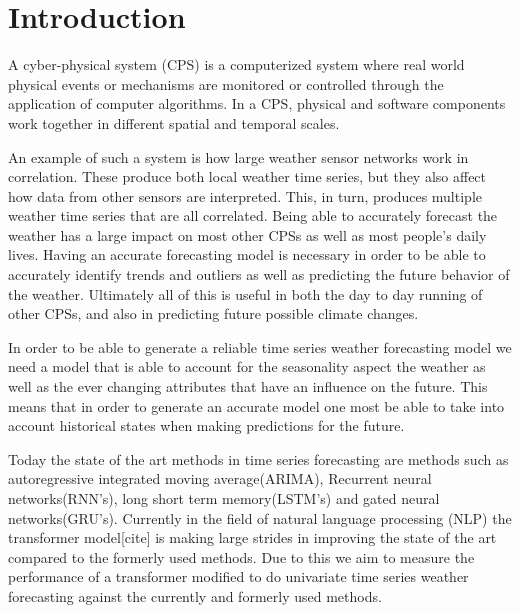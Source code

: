 \section{Introduction}
\label{sec:intro}
A cyber-physical system (CPS) is a computerized system where real world physical events or mechanisms are monitored or controlled through the application of computer algorithms.
In a CPS, physical and software components work together in different spatial and temporal scales.

An example of such a system is how large weather sensor networks work in correlation. These produce both local weather time series, but they also affect how data from other sensors are interpreted. This, in turn, produces multiple weather time series that are all correlated. Being able to accurately forecast the weather has a large impact on most other CPSs as well as most people's daily lives. Having an accurate forecasting model is necessary in order to be able to accurately identify trends and outliers as well as predicting the future behavior of the weather. Ultimately all of this is useful in both the day to day running of other CPSs, and also in predicting future possible climate changes. 

In order to be able to generate a reliable time series weather forecasting model we need a model that is able to account for the seasonality aspect the weather as well as the ever changing attributes that have an influence on the future. This means that in order to generate an accurate model one most be able to take into account historical states when making predictions for the future. 

Today the state of the art methods in time series forecasting are methods such as autoregressive integrated moving average(ARIMA), Recurrent neural networks(RNN's), long short term memory(LSTM's) and gated neural networks(GRU's). Currently in the field of natural language processing (NLP) the transformer model[cite] is making large strides in improving the state of the art compared to the formerly used methods. Due to this we aim to measure the performance of a transformer modified to do univariate time series weather forecasting against the currently and formerly used methods. 

